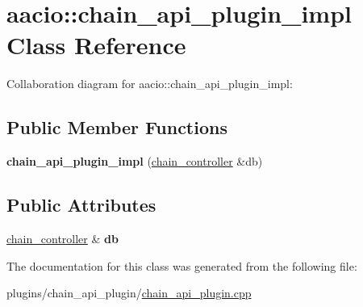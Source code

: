 \hypertarget{classaacio_1_1chain__api__plugin__impl}{}\section{aacio\+:\+:chain\+\_\+api\+\_\+plugin\+\_\+impl Class Reference}
\label{classaacio_1_1chain__api__plugin__impl}


Collaboration diagram for aacio\+:\+:chain\+\_\+api\+\_\+plugin\+\_\+impl\+:
\subsection*{Public Member Functions}
\begin{DoxyCompactItemize}
\item 
\mbox{\label{classaacio_1_1chain__api__plugin__impl_a455b63bf66e8951b8e80ac5ca7fa2981}} 
{\bfseries chain\+\_\+api\+\_\+plugin\+\_\+impl} (\mbox{\hyperlink{classaacio_1_1chain_1_1chain__controller}{chain\+\_\+controller}} \&db)
\end{DoxyCompactItemize}
\subsection*{Public Attributes}
\begin{DoxyCompactItemize}
\item 
\mbox{\label{classaacio_1_1chain__api__plugin__impl_aead4ccabb90aa653d68e9986d00d8f56}} 
\mbox{\hyperlink{classaacio_1_1chain_1_1chain__controller}{chain\+\_\+controller}} \& {\bfseries db}
\end{DoxyCompactItemize}


The documentation for this class was generated from the following file\+:\begin{DoxyCompactItemize}
\item 
plugins/chain\+\_\+api\+\_\+plugin/\mbox{\hyperlink{chain__api__plugin_8cpp}{chain\+\_\+api\+\_\+plugin.\+cpp}}\end{DoxyCompactItemize}
